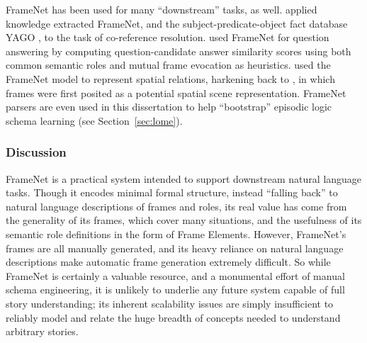 FrameNet has been used for many ``downstream'' tasks, as well. \citet{rahman2011} applied knowledge extracted FrameNet, and the subject-predicate-object fact database YAGO \citep{yago}, to the task of co-reference resolution. \citet{shen2007using} used FrameNet for question answering by computing question-candidate answer similarity scores using both common semantic roles and mutual frame evocation as heuristics. \citet{framenetspatial} used the FrameNet model to represent spatial relations, harkening back to \citep{Minsky:1974:FRK:889222}, in which frames were first posited as a potential spatial scene representation. FrameNet parsers are even used in this dissertation to help ``bootstrap'' episodic logic schema learning (see Section~\ref{sec:lome}).

\subsubsection{Discussion}

FrameNet is a practical system intended to support downstream natural language tasks. Though it encodes minimal formal structure, instead ``falling back'' to natural language descriptions of frames and roles, its real value has come from the generality of its frames, which cover many situations, and the usefulness of its semantic role definitions in the form of Frame Elements. However, FrameNet's frames are all manually generated, and its heavy reliance on natural language descriptions make automatic frame generation extremely difficult. So while FrameNet is certainly a valuable resource, and a monumental effort of manual schema engineering, it is unlikely to underlie any future system capable of full story understanding; its inherent scalability issues are simply insufficient to reliably model and relate the huge breadth of concepts needed to understand arbitrary stories.

